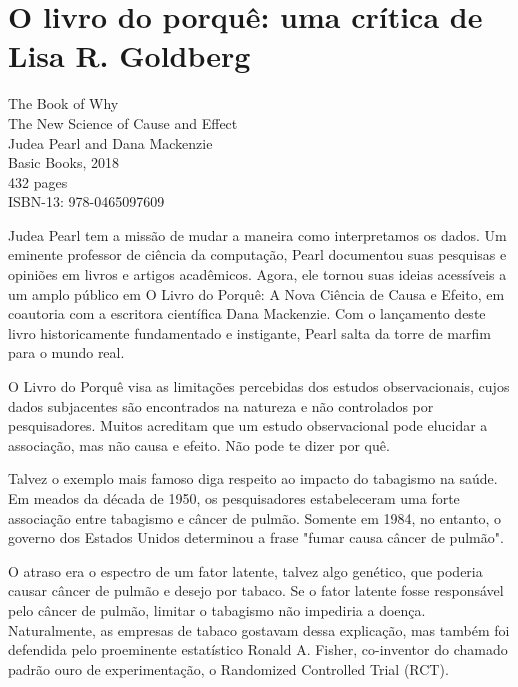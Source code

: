 \section*{O livro do porquê: uma crítica de Lisa R. Goldberg}



\noindent
\begin{minipage}[!ht]{0.25\columnwidth}
\end{minipage}
\begin{minipage}[!ht]{0.75\columnwidth}\scriptsize
The Book of Why \\
The New Science of Cause and Effect \\
Judea Pearl and Dana Mackenzie \\
Basic Books, 2018 \\
432 pages \\
ISBN-13: 978-0465097609
\end{minipage}


Judea Pearl tem a missão de mudar a maneira como interpretamos os dados. Um eminente professor de ciência da computação, Pearl documentou suas pesquisas e opiniões em livros e artigos acadêmicos. Agora, ele tornou suas ideias acessíveis a um amplo público em O Livro do Porquê: A Nova Ciência de Causa e Efeito, em coautoria com a escritora científica Dana Mackenzie. Com o lançamento deste livro historicamente fundamentado e instigante, Pearl salta da torre de marfim para o mundo real.

    O Livro do Porquê visa as limitações percebidas dos estudos observacionais, cujos dados subjacentes são encontrados na natureza e não controlados por pesquisadores. Muitos acreditam que um estudo observacional pode elucidar a associação, mas não causa e efeito. Não pode te dizer por quê.

    Talvez o exemplo mais famoso diga respeito ao impacto do tabagismo na saúde. Em meados da década de 1950, os pesquisadores estabeleceram uma forte associação entre tabagismo e câncer de pulmão. Somente em 1984, no entanto, o governo dos Estados Unidos determinou a frase "fumar causa câncer de pulmão".

    O atraso era o espectro de um fator latente, talvez algo genético, que poderia causar câncer de pulmão e desejo por tabaco. Se o fator latente fosse responsável pelo câncer de pulmão, limitar o tabagismo não impediria a doença. Naturalmente, as empresas de tabaco gostavam dessa explicação, mas também foi defendida pelo proeminente estatístico Ronald A. Fisher, co-inventor do chamado padrão ouro de experimentação, o Randomized Controlled Trial (RCT).

